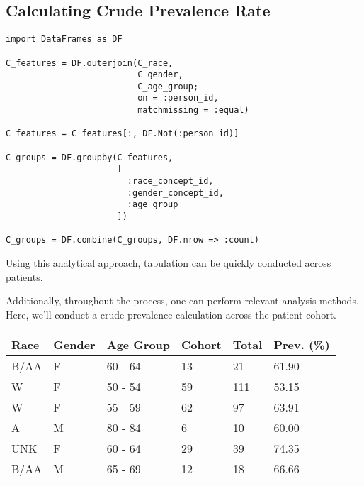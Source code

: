\documentclass{juliacon}
\begin{document}
\subsection{Calculating Crude Prevalence Rate}



\begin{verbatim}
import DataFrames as DF

C_features = DF.outerjoin(C_race,
                          C_gender,
                          C_age_group;
                          on = :person_id, 
                          matchmissing = :equal)

C_features = C_features[:, DF.Not(:person_id)]

C_groups = DF.groupby(C_features, 
                      [
                        :race_concept_id, 
                        :gender_concept_id, 
                        :age_group
                      ])

C_groups = DF.combine(C_groups, DF.nrow => :count)
\end{verbatim}

Using this analytical approach, tabulation can be quickly conducted across patients.

Additionally, throughout the process, one can perform relevant analysis methods.
Here, we'll conduct a crude prevalence calculation across the patient cohort.


\begin{table}[!ht]
    \centering
    \begin{tabular}{|l|l|l|l|l|l|}
    \hline
        Race & Gender & Age Group & Cohort & Total & Prev. (\%) \\ \hline
        B/AA & F & 60 - 64 & 13 & 21 & 61.90 \\ \hline
        W & F & 50 - 54 & 59 & 111 & 53.15 \\ \hline
        W & F & 55 - 59 & 62 & 97 & 63.91 \\ \hline
        A & M & 80 - 84 & 6 & 10 & 60.00 \\ \hline
        UNK & F & 60 - 64 & 29 & 39 & 74.35 \\ \hline
        B/AA & M & 65 - 69 & 12 & 18 & 66.66 \\ \hline
    \end{tabular}
\end{table}
\end{document}
